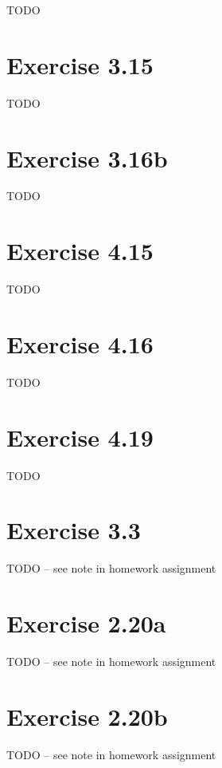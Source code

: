 \documentclass{article}
\begin{document}
TODO 

\section{Exercise 3.15}

TODO 

\section{Exercise 3.16b}

TODO 

\section{Exercise 4.15}

TODO 

\section{Exercise 4.16}

TODO 

\section{Exercise 4.19}

TODO 

\section{Exercise 3.3}

TODO -- see note in homework assignment

\section{Exercise 2.20a}

TODO -- see note in homework assignment

\section{Exercise 2.20b}

TODO -- see note in homework assignment
\end{document}
